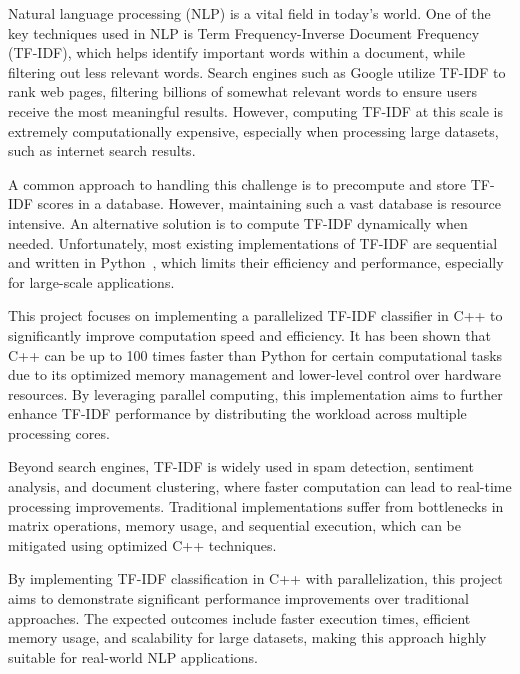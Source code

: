 \documentclass[conference]{IEEEtran}
\begin{document}
Natural language processing (NLP) is a vital field in today’s world. One of the key techniques used in NLP is Term Frequency-Inverse Document Frequency (TF-IDF), which helps identify important words within a document, while filtering out less relevant words. Search engines such as Google utilize TF-IDF to rank web pages, filtering billions of somewhat relevant words to ensure users receive the most meaningful results. However, computing TF-IDF at this scale is extremely computationally expensive, especially when processing large datasets, such as internet search results.

A common approach to handling this challenge is to precompute and store TF-IDF scores in a database. However, maintaining such a vast database is resource intensive. An alternative solution is to compute TF-IDF dynamically when needed. Unfortunately, most existing implementations of TF-IDF are sequential and written in Python~\cite{b4}, which limits their efficiency and performance, especially for large-scale applications.

This project focuses on implementing a parallelized TF-IDF classifier in C++ to significantly improve computation speed and efficiency. It has been shown that C++ can be up to 100 times faster than Python for certain computational tasks due to its optimized memory management and lower-level control over hardware resources. By leveraging parallel computing, this implementation aims to further enhance TF-IDF performance by distributing the workload across multiple processing cores.

Beyond search engines, TF-IDF is widely used in spam detection, sentiment analysis, and document clustering, where faster computation can lead to real-time processing improvements. Traditional implementations suffer from bottlenecks in matrix operations, memory usage, and sequential execution, which can be mitigated using optimized C++ techniques. %

By implementing TF-IDF classification in C++ with parallelization, this project aims to demonstrate significant performance improvements over traditional approaches. The expected outcomes include faster execution times, efficient memory usage, and scalability for large datasets, making this approach highly suitable for real-world NLP applications.
\end{document}
